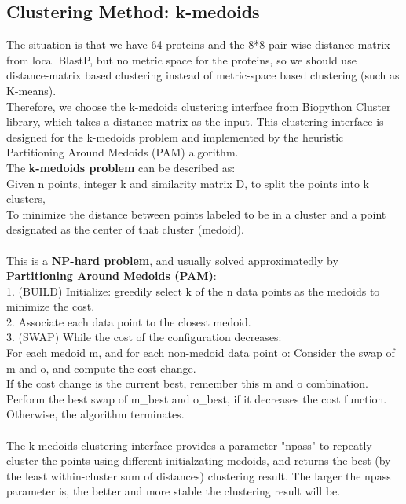 \documentclass[a4paper, 12pt, one column]{article}
\begin{document}
\subsection{Clustering Method: k-medoids}
The situation is that we have 64 proteins and the 8*8 pair-wise distance matrix from local BlastP, but no metric space for the proteins, so we should use distance-matrix based clustering instead of metric-space based clustering (such as K-means). \\
Therefore, we choose the k-medoids clustering interface from Biopython Cluster library, which takes a distance matrix as the input. This clustering interface is designed for the k-medoids problem and implemented by the heuristic Partitioning Around Medoids (PAM) algorithm. \\
The \textbf{k-medoids problem} can be described as: \\
Given n points, integer k and similarity matrix D, to split the points into k clusters, \\
To minimize the distance between points labeled to be in a cluster and a point designated as the center of that cluster (medoid). \\
\\
This is a \textbf{NP-hard problem}, and usually solved approximatedly by \textbf{Partitioning Around Medoids (PAM)}: \\
1. (BUILD) Initialize: greedily select k of the n data points as the medoids to minimize the cost. \\
2. Associate each data point to the closest medoid. \\ 
3. (SWAP) While the cost of the configuration decreases: \\ 
For each medoid m, and for each non-medoid data point o:
Consider the swap of m and o, and compute the cost change. \\
If the cost change is the current best, remember this m and o combination. \\
Perform the best swap of m\_best and o\_best, if it decreases the cost function. Otherwise, the algorithm terminates.\\
\\
The k-medoids clustering interface provides a parameter "npass" to repeatly cluster the points using different initialzating medoids, and returns the best (by the least within-cluster sum of distances) clustering result. The larger the npass parameter is, the better and more stable the clustering result will be.\\
\end{document}
